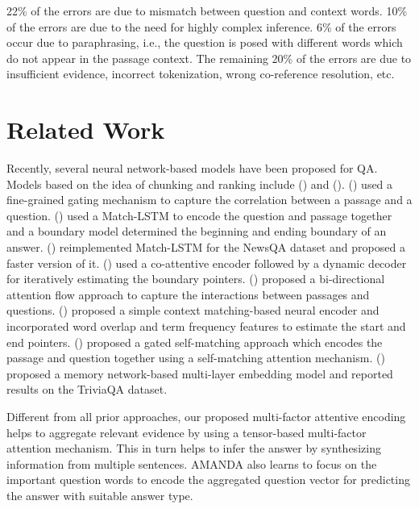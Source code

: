 \documentclass[letterpaper]{article} %
\begin{document}
22\% of the errors are due to mismatch between question and context words. 
10\% of the errors are due to the need for highly complex inference. 
6\% of the errors occur due to paraphrasing, i.e., the question is posed with different words which do not appear in the passage context.
The remaining 20\% of the errors are due to insufficient evidence, incorrect tokenization, wrong co-reference resolution, etc.
\section{Related Work}
\label{sec:related_works}
Recently, several neural network-based models have been proposed for QA.
Models based on the idea of chunking and ranking include \citeauthor{ibm_squad} (\citeyear{ibm_squad}) and \citeauthor{google_squad} (\citeyear{google_squad}). 
\citeauthor{cmu_squad} (\citeyear{cmu_squad}) used a fine-grained gating mechanism to capture the correlation between a passage and a question.
\citeauthor{smu_squad} (\citeyear{smu_squad}) used a Match-LSTM to encode the question and passage together and a boundary model determined the beginning and ending boundary of an answer. 
\citeauthor{newsqa} (\citeyear{newsqa}) reimplemented Match-LSTM for the NewsQA dataset and proposed a faster version of it.
\citeauthor{salesforce_squad} (\citeyear{salesforce_squad}) used a co-attentive encoder followed by a dynamic decoder for iteratively estimating the boundary pointers.
\citeauthor{allenai_squad} (\citeyear{allenai_squad}) proposed a bi-directional attention flow approach to capture the interactions between passages and questions.
\citeauthor{fastqa_squad} (\citeyear{fastqa_squad}) proposed a simple context matching-based neural encoder and incorporated word overlap and term frequency features to estimate the start and end pointers.
\citeauthor{rnet_squad} (\citeyear{rnet_squad}) proposed a gated self-matching approach which encodes the passage and question together using a self-matching attention mechanism.
\citeauthor{memen} (\citeyear{memen}) proposed a memory network-based multi-layer embedding model and reported results on the TriviaQA dataset.

Different from all prior approaches, our proposed multi-factor attentive encoding helps to aggregate relevant evidence by using a tensor-based multi-factor attention mechanism. This in turn helps to infer the answer by synthesizing information from multiple sentences.
AMANDA also learns to focus on the important question words to encode the aggregated question vector for predicting the answer with suitable answer type. 
\end{document}
